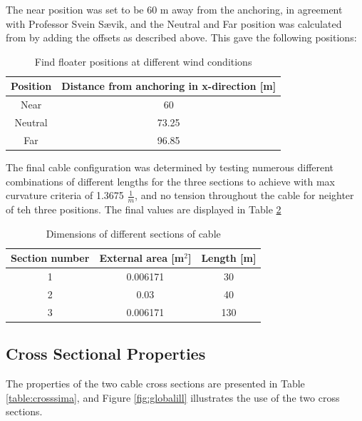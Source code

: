 \noindent The near position was set to be 60 m away from the anchoring, in agreement with Professor Svein Sævik, and the Neutral and Far position was calculated from by adding the offsets as described above. This gave the following positions: 
\begin{table} [H]
\centering
\begin{tabular}{ |c|c|}
\hline
Position & Distance from anchoring in x-direction [m] \\
 \hline
 \hline
 
Near & 60\\

Neutral & 73.25\\

Far & 96.85 \\
 
 \hline
\end{tabular}
\caption{Find floater positions at different wind conditions}
\label{table:pos}
\end{table}

\noindent The final cable configuration was determined by testing numerous different combinations of different lengths for the three sections to achieve with max curvature criteria of 1.3675 $\frac{1}{m}$, and no tension throughout the cable for neighter of teh three positions. The final values are displayed in Table \ref{table:DIMCABLE} 
\begin{table} [H]
\centering
\begin{tabular}{ |c|c|c|}
\hline
Section number & External area [m$^2$] & Length [m] \\
 \hline
 \hline
1 & 0.006171 & 30\\
2 & 0.03 & 40\\
3 & 0.006171 & 130\\
 \hline
\end{tabular}
\caption{Dimensions of different sections of cable}
\label{table:DIMCABLE}
\end{table}

\subsection{Cross Sectional Properties}
The properties of the two cable cross sections are presented in Table \ref{table:crosssima}, and Figure \ref{fig:globalill} illustrates the use of the two cross sections.


